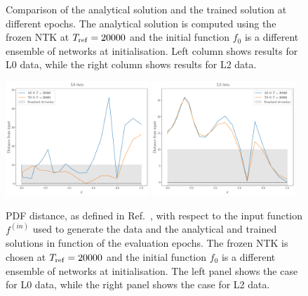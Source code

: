 \begin{figure}[ht!]
    \caption{Comparison of the analytical solution and the trained solution at
    different epochs. The analytical solution is computed using the frozen NTK
    at $T_{\rm ref} = 20000$ and the initial function $f_0$ is a different
    ensemble of networks at initialisation. Left column shows results for L0
    data, while the right column shows results for L2 data.}
    \label{fig:xT3_analytical_vs_trained}
  \end{figure}

  \begin{figure}[ht!]
    \centering
    \includegraphics[width=0.48\textwidth]{plots/analytical_solution/distance_from_input/distance_plot_from_input_epoch_20000_L0.pdf}
    \includegraphics[width=0.48\textwidth]{plots/analytical_solution/distance_from_input/distance_plot_from_input_epoch_20000_L2.pdf}
    \caption{PDF distance, as defined in Ref.~\cite{NNPDF:2021njg}, with respect to
    the input function $f^{(in)}$ used to generate the data and the analytical and trained
    solutions in function of the evaluation epochs. The frozen NTK
    is chosen at $T_{\rm ref} = 20000$ and the initial function $f_0$ is a different
    ensemble of networks at initialisation. The left panel shows the case for L0 data,
    while the right panel shows the case for L2 data.}
    \label{fig:xT3_distance_L0_L2}
  \end{figure}


